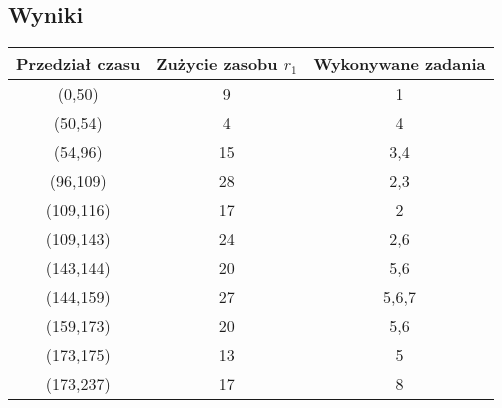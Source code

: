 \documentclass{article}
\begin{document}
\subsection{Wyniki}


\begin{center}
\begin{tabular}{|c|c|c|}
\hline
\textbf{Przedział czasu} & \textbf{Zużycie zasobu $r_1$} & \textbf{Wykonywane zadania}\\
\hline
(0,50) & 9 & 1 \\
\hline
(50,54) & 4 & 4 \\
\hline
(54,96) & 15 & 3,4 \\
\hline
(96,109) & 28 & 2,3 \\
\hline
(109,116) & 17 & 2 \\
\hline
(109,143) & 24 & 2,6 \\
\hline
(143,144) & 20 & 5,6 \\
\hline
(144,159) & 27 & 5,6,7 \\
\hline
(159,173) & 20 & 5,6 \\
\hline
(173,175) & 13 & 5 \\
\hline
(173,237) & 17 & 8 \\
\hline
\end{tabular}
\end{center}
\end{document}
